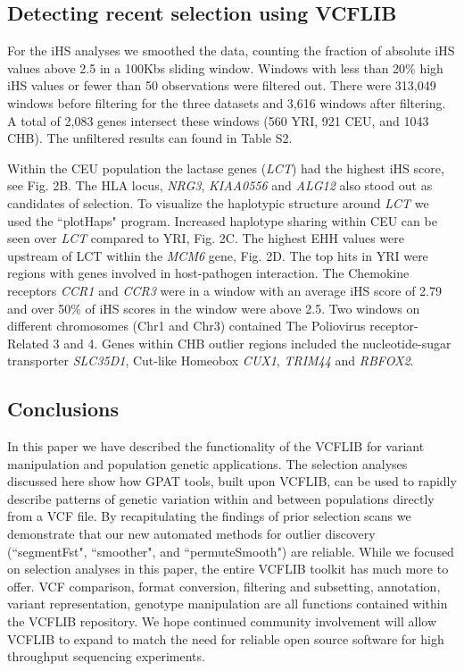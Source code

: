 \documentclass[10pt,letterpaper]{article}
\begin{document}
\subsection*{Detecting recent selection using VCFLIB}

For the iHS analyses we smoothed the data, counting the fraction of absolute iHS values above 2.5 in a 100Kbs sliding window.  Windows with less than 20\% high iHS values or fewer than 50 observations were filtered out. There were 313,049 windows before filtering for the three datasets and 3,616 windows after filtering.  A total of 2,083 genes intersect these windows (560 YRI, 921 CEU, and 1043 CHB).  The unfiltered results can found in Table S2. 

Within the CEU population the lactase genes (\textit{LCT}) had the highest iHS score, see Fig. 2B.  The HLA locus, \textit{NRG3}, \textit{KIAA0556} and \textit{ALG12} also stood out as candidates of selection.  To visualize the haplotypic structure around \textit{LCT} we used the ``plotHaps" program.  Increased haplotype sharing within CEU can be seen over \textit{LCT} compared to YRI, Fig. 2C.  The highest EHH values were upstream of LCT within the \textit{MCM6} gene, Fig. 2D.  The top hits in YRI were regions with genes involved in host-pathogen interaction.  The Chemokine receptors \textit{CCR1} and \textit{CCR3} were in a window with an average iHS score of 2.79 and over 50\% of iHS scores in the window were above 2.5. Two windows on different chromosomes  (Chr1 and Chr3) contained The Poliovirus receptor-Related 3 and 4.  Genes within CHB outlier regions included the nucleotide-sugar transporter \textit{SLC35D1}, Cut-like Homeobox \textit{CUX1}, \textit{TRIM44} and \textit{RBFOX2}.

\subsection*{Conclusions}

In this paper we have described the functionality of the VCFLIB for variant manipulation and population genetic applications.  The selection analyses discussed here show how GPAT tools, built upon VCFLIB, can be used to rapidly describe patterns of genetic variation within and between populations directly from a VCF file.  By recapitulating the findings of prior selection scans we demonstrate that our new automated methods for outlier discovery (``segmentFst", ``smoother", and ``permuteSmooth") are reliable.  While we focused on selection analyses in this paper, the entire VCFLIB toolkit has much more to offer. VCF comparison, format conversion, filtering and subsetting, annotation, variant representation, genotype manipulation are all functions contained within the VCFLIB repository.  We hope continued community involvement will allow VCFLIB to expand to match the need for reliable open source software for high throughput sequencing experiments. 
\end{document}
